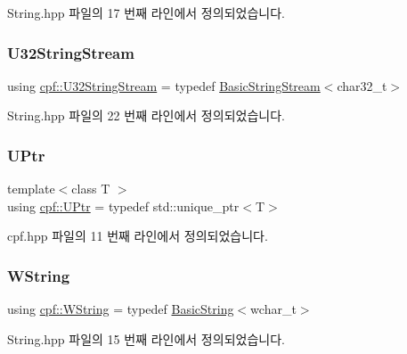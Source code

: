 String.\+hpp 파일의 17 번째 라인에서 정의되었습니다.

\mbox{\label{namespacecpf_a7e95b195d831b69d8e661dd685128097}} 
\subsubsection{\texorpdfstring{U32\+String\+Stream}{U32StringStream}}
{\footnotesize\ttfamily using \hyperlink{namespacecpf_a7e95b195d831b69d8e661dd685128097}{cpf\+::\+U32\+String\+Stream} = typedef \hyperlink{namespacecpf_a1fe334b3d2422535a1cfe51785d98cb8}{Basic\+String\+Stream}$<$char32\+\_\+t$>$}



String.\+hpp 파일의 22 번째 라인에서 정의되었습니다.

\mbox{\label{namespacecpf_ae8ac5e55927cc357960f1d47c19fe0b9}} 
\subsubsection{\texorpdfstring{U\+Ptr}{UPtr}}
{\footnotesize\ttfamily template$<$class T $>$ \\
using \hyperlink{namespacecpf_ae8ac5e55927cc357960f1d47c19fe0b9}{cpf\+::\+U\+Ptr} = typedef std\+::unique\+\_\+ptr$<$T$>$}



cpf.\+hpp 파일의 11 번째 라인에서 정의되었습니다.

\mbox{\label{namespacecpf_ad36115a5fb55fb1cc257eeab6aed2d7a}} 
\subsubsection{\texorpdfstring{W\+String}{WString}}
{\footnotesize\ttfamily using \hyperlink{namespacecpf_ad36115a5fb55fb1cc257eeab6aed2d7a}{cpf\+::\+W\+String} = typedef \hyperlink{namespacecpf_ac91c8c57a370a5bef21ac23f876ad536}{Basic\+String}$<$wchar\+\_\+t$>$}



String.\+hpp 파일의 15 번째 라인에서 정의되었습니다.

\mbox{\label{namespacecpf_a7e79dec7a6790331bee7ef1e85dafba6}} 
